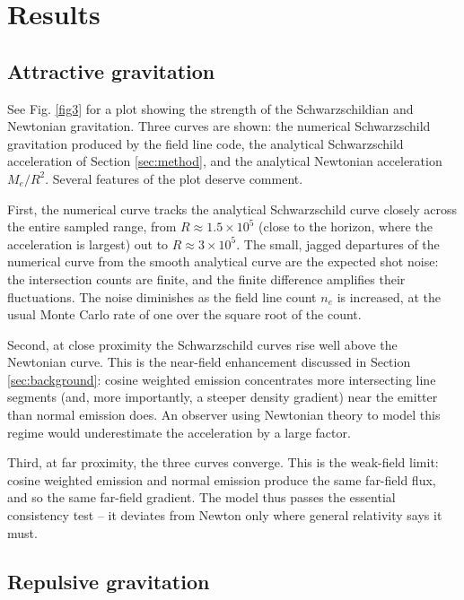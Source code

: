 \documentclass[10pt]{article}
\begin{document}
\section{Results}
\label{sec:results}

\subsection{Attractive gravitation}

See Fig. \ref{fig3} for a plot showing the strength of the Schwarzschildian and Newtonian gravitation.
Three curves are shown: the numerical Schwarzschild gravitation produced by the field line code, the analytical Schwarzschild acceleration of Section \ref{sec:method}, and the analytical Newtonian acceleration $M_e / R^2$.
Several features of the plot deserve comment.

First, the numerical curve tracks the analytical Schwarzschild curve closely across the entire sampled range, from $R \approx 1.5 \times 10^5$ (close to the horizon, where the acceleration is largest) out to $R \approx 3 \times 10^5$.
The small, jagged departures of the numerical curve from the smooth analytical curve are the expected shot noise: the intersection counts are finite, and the finite difference amplifies their fluctuations.
The noise diminishes as the field line count $n_e$ is increased, at the usual Monte Carlo rate of one over the square root of the count.

Second, at close proximity the Schwarzschild curves rise well above the Newtonian curve.
This is the near-field enhancement discussed in Section \ref{sec:background}: cosine weighted emission concentrates more intersecting line segments (and, more importantly, a steeper density gradient) near the emitter than normal emission does.
An observer using Newtonian theory to model this regime would underestimate the acceleration by a large factor.

Third, at far proximity, the three curves converge.
This is the weak-field limit: cosine weighted emission and normal emission produce the same far-field flux, and so the same far-field gradient.
The model thus passes the essential consistency test -- it deviates from Newton only where general relativity says it must.

\subsection{Repulsive gravitation}
\end{document}
